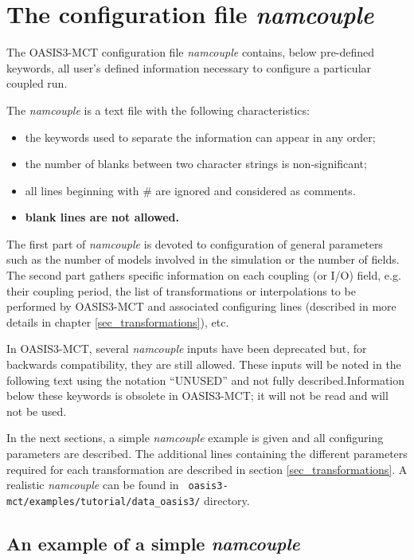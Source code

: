 \newpage
\chapter{The configuration file {\it namcouple}}
\label{sec_namcouple}

The OASIS3-MCT configuration file {\it namcouple} contains, below
pre-defined keywords, all user's
defined information necessary to configure a particular coupled
run. 

The {\it namcouple} is a text file with the following
characteristics:

\begin{itemize}
\item the keywords used to separate the information
can appear in any order;
\item the number of blanks between two character strings is
non-significant; 
\item all lines beginning with \# are ignored and considered as
comments.
\item {\bf blank lines are not allowed.}
\end{itemize}

The first part of {\it namcouple } is devoted to configuration of
general parameters such as the number of models involved in the
simulation or the number of fields.
The second part gathers specific information on each coupling (or I/O)
field, e.g. their coupling period, the list of transformations or
interpolations to be performed by OASIS3-MCT and associated
configuring lines (described in more details in chapter
\ref{sec_transformations}), etc.

In OASIS3-MCT, several {\it namcouple} inputs have been deprecated but, for backwards compatibility, they are still 
allowed.  These inputs will be noted in the following text using the
notation ``UNUSED'' and not fully described.Information below these keywords is
  obsolete in OASIS3-MCT; it will not be read and will not be used. 

In the next sections, a simple {\it namcouple} example is given and
all configuring parameters are described. The additional lines
containing the different parameters required for each transformation
are described in section \ref{sec_transformations}. A
realistic {\it namcouple} can be found in 
{\tt
oasis3-mct/examples/tutorial/data\_oasis3/} directory.

\section{An example of a simple {\it namcouple}}
\label{subsec_examplenamcouple}

